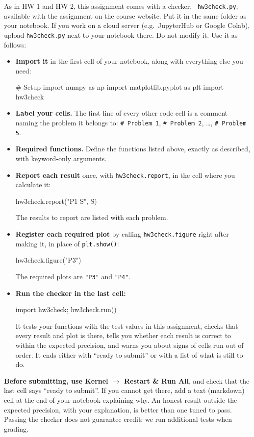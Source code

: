 \documentclass[12pt]{article}
\begin{document}
\noindent
As in HW 1 and HW 2, this assignment comes with a checker, {\tt
  hw3check.py}, available with the assignment on the course website.
Put it in the same folder as your notebook.  If you work on a cloud
server (e.g.\ JupyterHub or Google Colab), upload {\tt hw3check.py}
next to your notebook there.  Do not modify it.  Use it as follows:
\begin{itemize}
\item {\bf Import it} in the first cell of your notebook, along with everything else you need:
\begin{python}
# Setup
import numpy as np
import matplotlib.pyplot as plt
import hw3check
\end{python}
\item {\bf Label your cells.}  The first line of every other code cell is a comment naming the
  problem it belongs to: {\tt \# Problem 1}, {\tt \# Problem 2}, \ldots, {\tt \# Problem 5}.
\item {\bf Required functions.}  Define the functions listed above, exactly as described, with
  keyword-only arguments.
\item {\bf Report each result} once, with {\tt hw3check.report}, in the cell where you calculate it:
\begin{python}
hw3check.report("P1 S", S)
\end{python}
  The results to report are listed with each problem.
\item {\bf Register each required plot} by calling {\tt hw3check.figure} right after making it, in
  place of {\tt plt.show()}:
\begin{python}
hw3check.figure("P3")
\end{python}
  The required plots are {\tt "P3"} and {\tt "P4"}.
\item {\bf Run the checker in the last cell:}
\begin{python}
import hw3check; hw3check.run()
\end{python}
  It tests your functions with the test values in this assignment,
  checks that every result and plot is there, tells you whether each result is correct to within
  the expected precision, and warns you about signs of cells run out of order.  It ends either
  with ``ready to submit'' or with a list of what is still to do.
\end{itemize}
{\bf Before submitting, use Kernel $\rightarrow$ Restart \& Run All}, and check that the last cell
says ``ready to submit''.  If you cannot get there, add a text (markdown) cell at the end of your
notebook explaining why.  An honest result outside the expected precision, with your explanation,
is better than one tuned to pass.  Passing the checker does not guarantee credit: we run
additional tests when grading.
\end{document}
